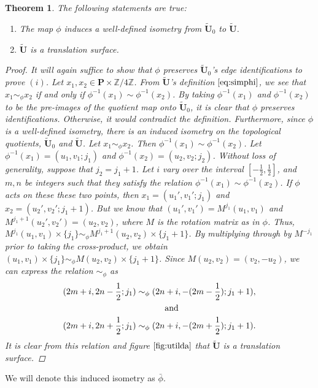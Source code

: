 \documentclass[]{article}
\newtheorem{thm}{Theorem}[subsection]
\begin{document}
\begin{thm}{The following statements are true:}
\begin{enumerate}[label=(\roman*)]
\item The map $\phi$ induces a well-defined isometry from $\tilde{\mathbf{U}}_0$ to $\tilde{\mathbf{U}}$.
\item $\tilde{\mathbf{U}}$ is a translation surface.
\end{enumerate}
\begin{proof}
It will again suffice to show that $\phi$ preserves $\tilde{\mathbf{U}}_0$'s edge identifications to prove $(i)$. Let $x_1,x_2\in\mathbf{P}\times\mathbb{Z}/4\mathbb{Z}$. From $\tilde{\mathbf{U}}$'s definition $\eqref{eq:simphi}$, we see that $x_1\sim_{\phi} x_2$ if and only if $\phi^{-1}(x_1) \sim \phi^{-1}(x_2)$. By taking $\phi^{-1}(x_1)$ and $ \phi^{-1}(x_2)$ to be the pre-images of the quotient map onto $\tilde{\mathbf{U}}_0$, it is clear that $\phi$ preserves identifications. Otherwise, it would contradict the definition. Furthermore, since $\phi$ is a well-defined isometry, there is an induced isometry on the topological quotients, $\tilde{\mathbf{U}}_0$ and $\tilde{\mathbf{U}}$.\newline
Let $x_1\sim_{\phi} x_2$. Then $\phi^{-1}(x_1) \sim \phi^{-1}(x_2)$. Let $\phi^{-1}(x_1)=(u_1,v_1;j_1)$ and $\phi^{-1}(x_2)=(u_2,v_2;j_2)$. Without loss of generality, suppose that $j_2=j_1+1$. Let $i$ vary over the interval $[-\frac{1}{2},\frac{1}{2}]$, and $m,n$ be integers such that they satisfy the relation $\phi^{-1}(x_1) \sim \phi^{-1}(x_2)$. If $\phi$ acts on these these two points, then $x_1 = (u_1',v_1';j_1)$ and $x_2 = (u_2',v_2';j_1+1)$. But we know that $(u_1',v_1')=M^{j_1}(u_1,v_1)$ and $M^{j_1+1}(u_2',v_2')=(u_2,v_2)$, where $M$ is the rotation matrix as in $\phi$. Thus, $M^{j_1}(u_1,v_1)\times\{j_1\}\sim_\phi M^{j_1+1}(u_2,v_2)\times\{j_1+1\}$. By multiplying through by $M^{-j_1}$ prior to taking the cross-product, we obtain $(u_1,v_1)\times\{j_1\}\sim_\phi M(u_2,v_2)\times\{j_1+1\}$. Since $M(u_2,v_2) = (v_2,-u_2)$, we can express the relation $\sim_\phi$ as
\begin{equation*}
\begin{split}
(2m+i, 2n-\frac{1}{2};j_1)\sim_\phi(2n+i, -(2m-\frac{1}{2});j_1+1),\\
\text{ and }\hspace{1.2in}\\
(2m+i, 2n+\frac{1}{2};j_1)\sim_\phi(2n+i, -(2m+\frac{1}{2});j_1+1).\\
\end{split}
\end{equation*}
It is clear from this relation and figure $\ref{fig:utilda}$ that $\tilde{\mathbf{U}}$ is a translation surface.
\end{proof}
\end{thm}
We will denote this induced isometry as $\bar{\phi}$.
\end{document}
